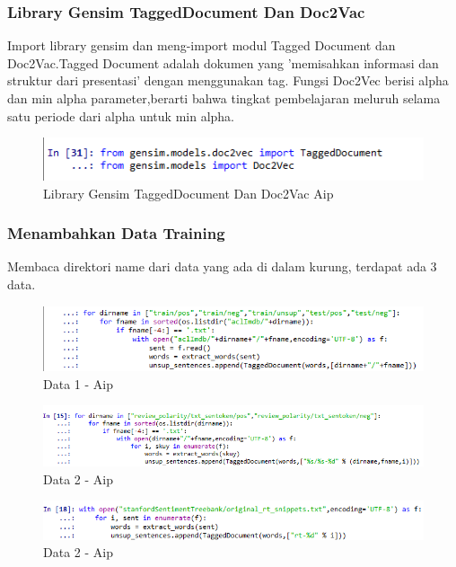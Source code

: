 \subsubsection{Library Gensim TaggedDocument Dan Doc2Vac}
Import library gensim dan meng-import modul Tagged Document dan Doc2Vac.Tagged Document adalah dokumen yang 'memisahkan informasi dan struktur dari presentasi' dengan menggunakan tag. Fungsi Doc2Vec berisi alpha dan min alpha parameter,berarti bahwa tingkat pembelajaran meluruh selama satu periode dari alpha untuk min alpha.
\begin{figure}[ht]
\centering
\includegraphics[scale=0.3]{figures/AIP/e18.PNG}
\caption{Library Gensim TaggedDocument Dan Doc2Vac Aip}
\label{Tagged Document dan Doc2Vec - Aip}
\end{figure}

\subsubsection{Menambahkan Data Training}
Membaca direktori name dari data yang ada di dalam kurung, terdapat ada 3 data.
\begin{figure}[ht]
\centering
\includegraphics[scale=0.3]{figures/AIP/e19.PNG}
\caption{Data 1 - Aip}
\label{Data 1 - Aip}
\end{figure}

\begin{figure}[ht]
\centering
\includegraphics[scale=0.3]{figures/AIP/e20.PNG}
\caption{Data 2 - Aip}
\label{Data 2 - Aip}
\end{figure}

\begin{figure}[ht]
\centering
\includegraphics[scale=0.3]{figures/AIP/e21.PNG}
\caption{Data 2 - Aip}
\label{Data 2 - Aip}
\end{figure}

